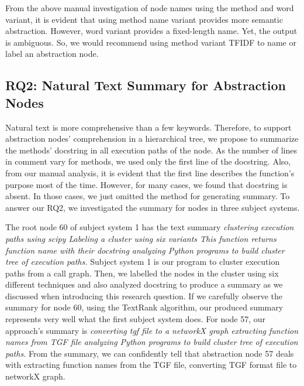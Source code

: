 From the above manual investigation of node names using the method and word variant, it is evident that using method name variant provides more semantic abstraction. However, word variant provides a fixed-length  name. Yet, the output is ambiguous. So, we would recommend using method variant TFIDF to name or label an abstraction node.







\subsection{ RQ2: Natural Text Summary for Abstraction Nodes}
 Natural text is more comprehensive than a few keywords. Therefore, to support abstraction nodes' comprehension in a hierarchical tree, we propose to summarize the methods' docstring in all execution paths of the node. As the number of lines in comment vary for methods,  we used only the first line of the docstring. Also, from our manual analysis, it is evident that the first line describes the function's purpose most of the time. However, for many cases, we found that docstring is absent. In those cases, we just omitted the method for generating summary. To answer our RQ2, we investigated the summary for nodes in three subject systems. 
 
 The root node 60 of subject system 1 has the text summary \textit{clustering execution paths using scipy Labeling a cluster using six variants  This function returns function name with their docstring  analyzing Python programs to build cluster tree of execution paths.} Subject system 1 is our program to cluster execution paths from a call graph. Then, we labelled the nodes in the cluster using six different techniques and also analyzed docstring to produce a summary as we discussed when introducing this research question. If we carefully observe the summary for node 60, using the TextRank algorithm, our produced summary represents very well what the first subject system does. For node 57, our approach's summary is \textit{converting tgf file to a networkX graph extracting function names from TGF file analyzing Python programs to build cluster tree of execution paths.} From the summary, we can confidently tell that abstraction node 57 deals with extracting function names from the TGF file, converting TGF format file to networkX graph.
 
